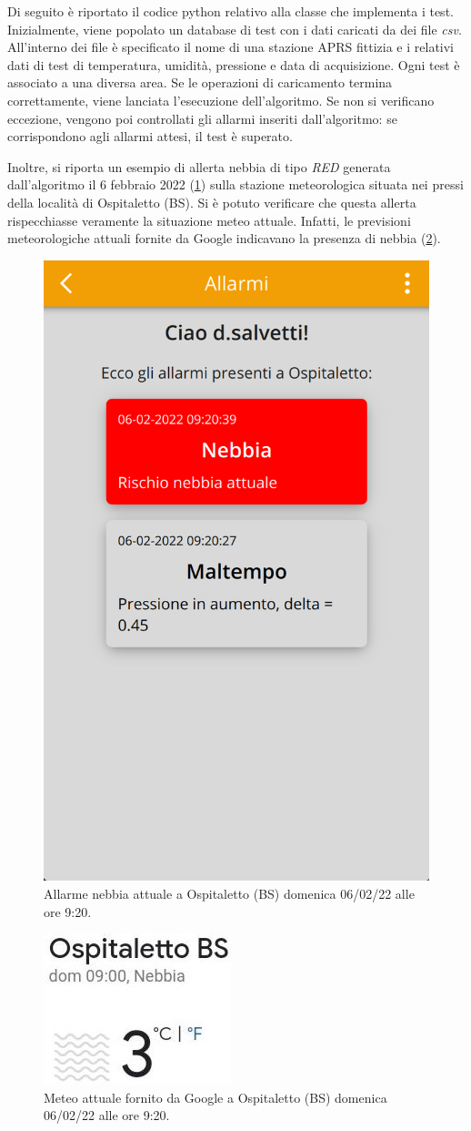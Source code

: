 Di seguito è riportato il codice python relativo alla classe che implementa i test. Inizialmente, viene popolato un database di test con i dati caricati da dei file \textit{csv}. All'interno dei file è specificato il nome di una stazione APRS fittizia e i relativi dati di test di temperatura, umidità, pressione e data di acquisizione. Ogni test è associato a una diversa area.  Se le operazioni di caricamento termina correttamente, viene lanciata l'esecuzione dell'algoritmo. Se non si verificano eccezione, vengono poi controllati gli allarmi inseriti dall'algoritmo: se corrispondono agli allarmi attesi, il test è superato.

\begingroup
\UseRawInputEncoding

\endgroup

Inoltre, si riporta un esempio di allerta nebbia di tipo \textit{RED} generata dall'algoritmo il 6 febbraio 2022 (\Fig\ref{fig:test_previsione_alg}) sulla stazione meteorologica situata nei pressi della località di Ospitaletto (BS). Si è potuto verificare che questa allerta rispecchiasse veramente la situazione meteo attuale. Infatti, le previsioni meteorologiche attuali fornite da Google indicavano la presenza di nebbia (\Fig\ref{fig:test_previsione_google}).

\begin{figure}[h!]
	\centering
	\includegraphics[width=0.3\linewidth]{./Iterazione 3/ImageFiles/testAppRedFog}
	\caption{Allarme nebbia attuale a Ospitaletto (BS) domenica 06/02/22 alle ore 9:20.}
	\label{fig:test_previsione_alg}
\end{figure}

\begin{figure}[h!]
	\centering
	\includegraphics[width=0.2\linewidth]{./Iterazione 3/ImageFiles/Nebbia Ospitaletto Google}
	\caption{Meteo attuale fornito da Google a Ospitaletto (BS) domenica 06/02/22 alle ore 9:20.}
	\label{fig:test_previsione_google}
\end{figure}

